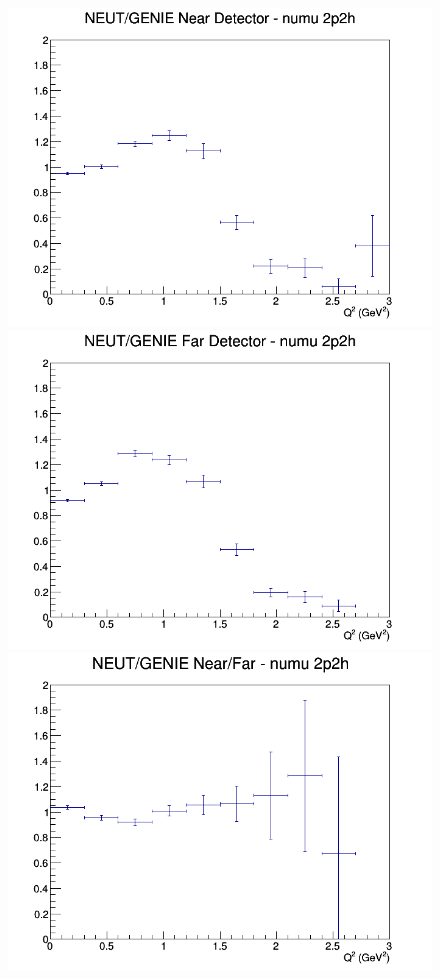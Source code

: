 \begin{figure}[h]
\endminipage
\newline
{}
\includegraphics[width=\linewidth]{eff_Q2/FGT/ratios/2p2h_NEUT_GENIE_numu_near_Q2.png}
\endminipage
{}
\includegraphics[width=\linewidth]{eff_Q2/FGT/ratios/2p2h_NEUT_GENIE_numu_far_Q2.png}
\endminipage
{}
\includegraphics[width=\linewidth]{eff_Q2/FGT/ratios/2p2h_NEUT_GENIE_numu_NF_Q2.png}

\end{figure}
